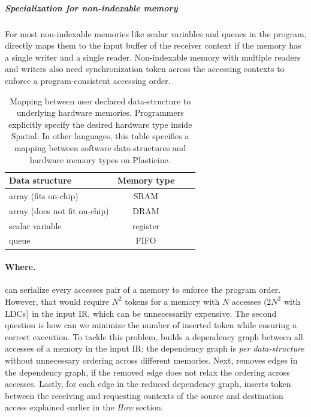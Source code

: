 \subparagraph{Specialization for non-indexable memory}
For most non-indexable memories like scalar variables and queues in the program, \name directly maps
them to the input buffer of the receiver context if the memory has a single writer and a single
reader.
Non-indexable memory with multiple readers and writers also need synchronization token across
the accessing contexts to enforce a program-consistent accessing order.

\begin{table}
  \centering
\begin{tabular}{lccc}
  \toprule
 Data structure & Memory type \\ \midrule
  array (fits on-chip) & SRAM \\
  array (does not fit on-chip) & DRAM \\
  scalar variable & register \\
  queue & FIFO \\
 \bottomrule
\end{tabular}
\caption[Mapping between data-structure to hardware memories]{
  Mapping between user declared data-structure to underlying hardware memories. 
  Programmers explicitly specify the desired hardware type inside Spatial. 
  In other languages, this table specifies a mapping between software data-structures 
  and hardware memory types on Plasticine.
}
\label{tab:memtype}
\end{table}

\paragraph{Where.}
\name can serialize every accesses pair of a memory to enforce the program order. However, that
would require $N^2$ tokens for a memory with $N$ accesses ($2N^2$ with LDCs) in the input IR, which can be
unnecessarily expensive.
The second question is how can we minimize the number of inserted token while ensuring a correct execution.
To tackle this problem, \name builds a dependency graph between all accesses of a memory in the input IR; 
the dependency graph is \emph{per data-structure} without unnecessary ordering across different memories.
Next, \name removes edges in the dependency graph, if the removed edge does not relax the ordering
across accesses.
Lastly, for each edge in the reduced dependency graph, \name inserts token between the receiving and
requesting contexts of the source and destination access explained earlier in the \emph{How} section.

